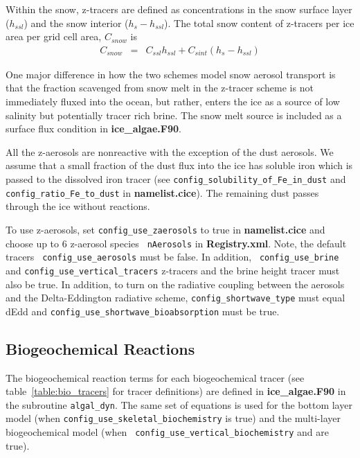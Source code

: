 Within the snow,  z-tracers are defined as concentrations in the snow
surface layer ($h_{ssl}$) and the snow interior ($h_s-h_{ssl}$).  The
total snow content of z-tracers per ice area per grid cell area, $C_{snow}$  is
\begin{eqnarray}
C_{snow} & = & C_{ssl}h_{ssl} + C_{sint}(h_{s}-h_{ssl})
\end{eqnarray}

One major difference in how the two schemes model snow aerosol transport is
that the fraction scavenged from snow melt in the z-tracer scheme is not immediately fluxed
into the ocean, but rather, enters the ice as a source of low
salinity but potentially tracer rich brine.  The snow melt source is
included as a surface flux condition in {\bf ice\_algae.F90}.

All the z-aerosols are nonreactive with the exception of the
dust aerosols. We assume that a small fraction of the dust flux into
the ice has soluble iron  which is passed to the dissolved iron
tracer (see {\tt config\_solubility\_of\_Fe\_in\_dust} and {\tt
  config\_ratio\_Fe\_to\_dust} in {\bf namelist.cice}).  The remaining dust passes through the ice without reactions.

To use z-aerosols, set {\tt config\_use\_zaerosols}  to true in {\bf
 namelist.cice} and choose up to 6  z-aerosol species {\tt
  nAerosols} in  {\bf
  Registry.xml}.    Note, the default tracers {\tt
  config\_use\_aerosols} must be false. In addition, {\tt
  config\_use\_brine} and {\tt config\_use\_vertical\_tracers} z-tracers and the brine height tracer  must also be
true.   In addition, to turn on the radiative
coupling between the aerosols and the Delta-Eddington radiative
scheme, {\tt config\_shortwave\_type} must equal dEdd and {\tt config\_use\_shortwave\_bioabsorption} must
be true.

\subsection{Biogeochemical Reactions}
\label{sec:reactions}
The biogeochemical reaction terms for each biogeochemical tracer (see
table~\ref{table:bio_tracers} for tracer definitions) are defined in {\bf ice\_algae.F90}
in the subroutine {\tt algal\_dyn}. The same set of equations is used
for the bottom layer  model (when {\tt config\_use\_skeletal\_biochemistry} is true) and the
multi-layer biogeochemical model (when {\tt
  config\_use\_vertical\_biochemistry} and  are true).

